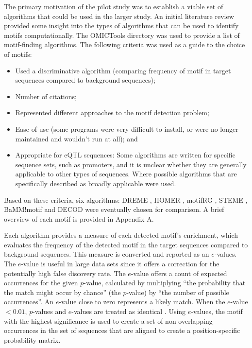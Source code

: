 \documentclass[12pt]{article}
\begin{document}
The primary motivation of the pilot study was to establish a viable set of algorithms that could be used in the larger study. An initial literature review provided some insight into the types of algorithms that can be used to identify motifs computationally. The OMICTools directory \citep{henry2014omictools} was used to provide a list of motif-finding algorithms. The following criteria was used as a guide to the choice of motifs:
\begin{itemize}
\item Used a discriminative algorithm (comparing frequency of motif in target sequences compared to background sequences);
\item Number of citations;
\item Represented different approaches to the motif detection problem;
\item Ease of use (some programs were very difficult to install, or were no longer maintained and wouldn't run at all); and
\item Appropriate for eQTL sequences: Some algorithms are written for specific sequence sets, such as promoters, and it is unclear whether they are generally applicable to other types of sequences. Where possible algorithms that are specifically described as broadly applicable were used.
\end{itemize}

Based on these criteria, six algorithms: DREME \citep{bailey2011dreme}, HOMER  \citep{heinz2010simple}, motifRG \citep{yao2014discriminative}, STEME \citep{reid2011steme}, BaMM!motif \citep{siebert2016bayesian} and DECOD \citep{huggins2011decod}  were eventually chosen for comparison. A brief overview of each motif is provided in Appendix A.

Each algorithm provides a measure of each detected motif's enrichment, which evaluates the frequency of the detected motif in the target sequences compared to background sequences. This measure is converted and reported as an $e$-values. The $e$-value is useful in large data sets since it offers a correction for the potentially high false discovery rate. The $e$-value offers a count of expected occurrences for the given $p$-value, calculated by multiplying ``the probability that the match might occur by chance'' (the $p$-value)  by ``the number of possible occurrences''. An $e$-value close to zero represents a likely match. When the $e$-value $< 0.01$, $p$-values and $e$-values are treated as identical \citep{NCBI2006}. Using $e$-values, the motif with the highest significance is used to create a set of non-overlapping occurrences in the set of sequences that are aligned to create a position-specific probability matrix.
\end{document}
